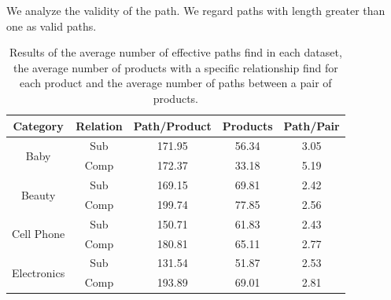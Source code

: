 \documentclass[review]{elsarticle}
\begin{document}
\begin{sloppypar}
We analyze the validity of the path. We regard paths with length greater than one as valid paths.
\begin{table}
\centering
\small
\caption{Results of the average number of effective paths find in each dataset, the average number of products with a specific relationship find for each product and the average number of paths between a pair of products.}
{
\begin{tabular}{c|c|ccc}
\hline
                                                                                    Category   & Relation & Path/Product & Products & Path/Pair \\ \hline
\multirow{2}{*}{Baby}                                                                  & Sub    & 171.95        & 56.34      & 3.05               \\
                                                                                       & Comp   & 172.37        & 33.18      & 5.19               \\ \hline
\multirow{2}{*}{Beauty}                                                                & Sub    & 169.15        & 69.81      & 2.42               \\
                                                                                       & Comp   & 199.74        & 77.85      & 2.56               \\ \hline
\multirow{2}{*}{Cell Phone} & Sub    & 150.71        & 61.83      & 2.43               \\
                                                                                       & Comp   & 180.81        & 65.11      & 2.77               \\ \hline
\multirow{2}{*}{Electronics}                                                           & Sub    & 131.54        & 51.87      & 2.53               \\
                                                                                       & Comp   & 193.89        & 69.01      & 2.81               \\ \hline


\end{tabular}}
\end{table}
\end{sloppypar}
\end{document}
